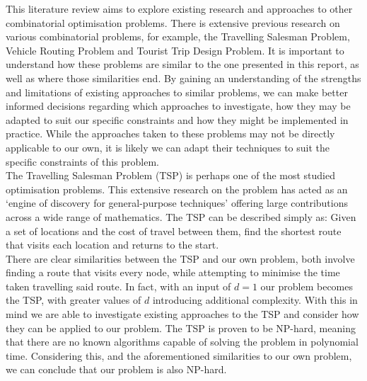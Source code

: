 This literature review aims to explore existing research and approaches to other combinatorial optimisation problems.
There is extensive previous research on various combinatorial problems, for example, the Travelling Salesman
Problem, Vehicle Routing Problem and Tourist Trip Design Problem.
It is important to understand how these problems are similar to the one presented in this report, as well as where
those similarities end.
By gaining an understanding of the strengths and limitations of existing approaches to similar problems, we can make
better informed decisions regarding which approaches to investigate, how they may be adapted to suit our specific
constraints and how they might be implemented in practice.
While the approaches taken to these problems may not be directly applicable to our own, it is likely we can adapt their
techniques to suit the specific constraints of this problem.\\

The Travelling Salesman Problem (TSP) is perhaps one of the most studied optimisation problems.
This extensive research on the problem has acted as an `engine of discovery for general-purpose techniques' offering
large contributions across a wide range of mathematics. 
The TSP can be described simply as: Given a set of locations and the cost of travel between them, find the shortest
route that visits each location and returns to the start.\\

There are clear similarities between the TSP and our own problem, both involve finding a route that visits every
node, while attempting to minimise the time taken travelling said route.
In fact, with an input of $d=1$ our problem becomes the TSP, with greater values of $d$ introducing additional
complexity.
With this in mind we are able to investigate existing approaches to the TSP and consider how they can be applied to
our problem.
The TSP is proven to be NP-hard, meaning that there are no
known algorithms capable of solving the problem in polynomial time.
Considering this, and the aforementioned similarities to our own problem, we can conclude that our problem is also
NP-hard.




